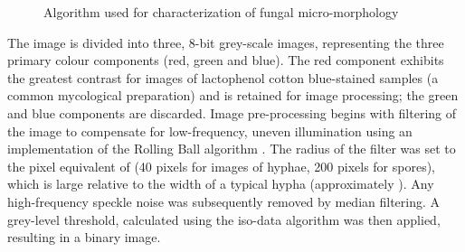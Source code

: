 \begin{figure}[htbp]
	\centering
	\caption{Algorithm used for characterization of fungal micro-morphology}
	\label{fig:MicroAlg}
\end{figure}

The image is divided into three, 8-bit grey-scale images, representing the three primary colour components (red, green and blue). The red component exhibits the greatest contrast for images of lactophenol cotton blue-stained samples (a common mycological preparation) and is retained for image processing; the green and blue components are discarded. Image pre-processing begins with filtering of the image to compensate for low-frequency, uneven illumination using an implementation of the Rolling Ball algorithm \cite{sternberg1983}. The radius of the filter was set to the pixel equivalent of  (40 pixels for images of hyphae, 200 pixels for spores), which is large relative to the width of a typical hypha (approximately ). Any high-frequency speckle noise was subsequently removed by median filtering. A grey-level threshold, calculated using the iso-data algorithm was then applied, resulting in a binary image.

